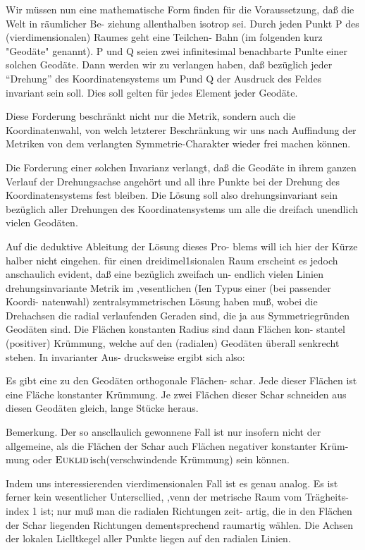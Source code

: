 Wir müssen nun eine mathematische Form finden
für die Voraussetzung, daß die Welt in räumlicher Be-
ziehung allenthalben isotrop sei. Durch jeden Punkt P
des (vierdimensionalen) Raumes geht eine Teilchen-
Bahn (im folgenden kurz "Geodäte" genannt). P und
Q seien zwei infinitesimal benachbarte Punl\:te einer
solchen Geodäte. Dann werden wir zu verlangen haben, daß bezüglich jeder \enquote{Drehung} des Koordinatensystems
um Pund Q der Ausdruck des Feldes invariant sein
soll. Dies soll gelten für jedes Element jeder Geodäte.

Diese Forderung beschränkt nicht nur die Metrik,
sondern auch die Koordinatenwahl, von welch letzterer
Beschränkung wir uns nach Auffindung der Metriken
von dem verlangten Symmetrie-Charakter wieder frei
machen können.

Die Forderung einer solchen Invarianz verlangt, daß
die Geodäte in ihrem ganzen Verlauf der Drehungsachse
angehört und all ihre Punkte bei der Drehung des
Koordinatensystems fest bleiben. Die Lösung soll also
drehungsinvariant sein bezüglich aller Drehungen des
Koordinatensystems um alle die dreifach unendlich
vielen Geodäten.

Auf die deduktive Ableitung der Lösung dieses Pro-
blems will ich hier der Kürze halber nicht eingehen.
für einen dreidimel1sionalen Raum erscheint es jedoch
anschaulich evident, daß eine bezüglich zweifach un-
endlich vielen Linien drehungsinvariante Metrik im
,vesentlichen (Ien Typus einer (bei passender Koordi-
natenwahl) zentralsymmetrischen Lösung haben muß,
wobei die Drehachsen die radial verlaufenden Geraden
sind, die ja aus Symmetriegründen Geodäten sind. Die
Flächen konstanten Radius sind dann Flächen kon-
stantel (positiver) Krümmung, welche auf den (radialen)
Geodäten überall senkrecht stehen. In invarianter Aus-
drucksweise ergibt sich also:

Es gibt eine zu den Geodäten orthogonale Flächen-
schar. Jede dieser Flächen ist eine Fläche konstanter
Krümmung. Je zwei Flächen dieser Schar schneiden
aus diesen Geodäten gleich, lange Stücke heraus.

Bemerkung. Der so anscllaulich gewonnene Fall
ist nur insofern nicht der allgemeine, als die Flächen
der Schar auch Flächen negativer konstanter Krüm-
mung oder $\textsc{Euklid}$isch(verschwindende Krümmung) sein
können.

Indem uns interessierenden vierdimensionalen Fall
ist es genau analog. Es ist ferner kein wesentlicher
Unterscllied, ,venn der metrische Raum vom Trägheits-
index 1 ist; nur muß man die radialen Richtungen zeit-
artig, die in den Flächen der Schar liegenden Richtungen
dementsprechend raumartig wählen. Die Achsen der
lokalen Liclltkegel aller Punkte liegen auf den radialen
Linien.

